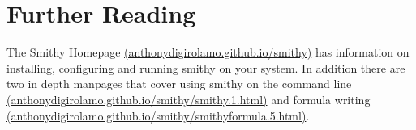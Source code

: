 \documentclass{acm_proc_article-sp}
\begin{document}
\section{Further Reading}

The Smithy Homepage
\href{http://anthonydigirolamo.github.io/smithy/}{(anthonydigirolamo.github.io/smithy)}
has information on installing, configuring and running smithy on your system. In
addition there are two in depth manpages that cover using smithy on the command
line
\href{http://anthonydigirolamo.github.io/smithy/smithy.1.html}{(anthonydigirolamo.github.io/smithy/smithy.1.html)}
and formula writing
\href{http://anthonydigirolamo.github.io/smithy/smithyformula.5.html}{(anthonydigirolamo.github.io/smithy/smithyformula.5.html)}.









\appendix
\end{document}

